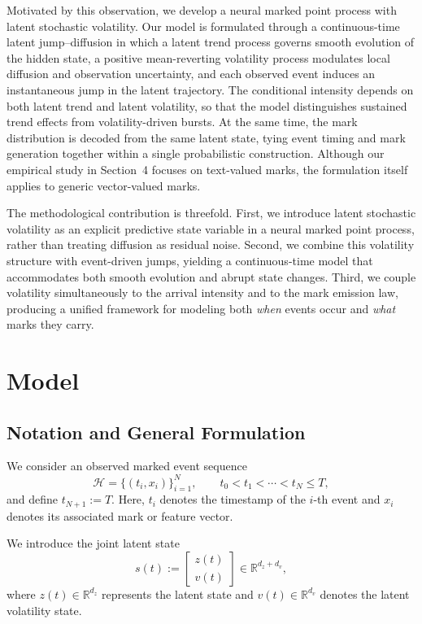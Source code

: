 \documentclass[11pt]{article}
\theoremstyle{definition}
\numberwithin{equation}{section}
\numberwithin{theorem}{section}
\numberwithin{proposition}{section}
\numberwithin{lemma}{section}
\numberwithin{corollary}{section}
\numberwithin{definition}{section}
\numberwithin{remark}{section}
\newcommand{\1}{\mathbbm{1}}
\begin{document}
Motivated by this observation, we develop a neural marked point process with latent stochastic volatility. 
Our model is formulated through a continuous-time latent jump--diffusion in which a latent trend process governs smooth evolution of the hidden state, a positive mean-reverting volatility process modulates local diffusion and observation uncertainty, and each observed event induces an instantaneous jump in the latent trajectory. 
The conditional intensity depends on both latent trend and latent volatility, so that the model distinguishes sustained trend effects from volatility-driven bursts. 
At the same time, the mark distribution is decoded from the same latent state, tying event timing and mark generation together within a single probabilistic construction. 
Although our empirical study in Section~4 focuses on text-valued marks, the formulation itself applies to generic vector-valued marks.

The methodological contribution is threefold. 
First, we introduce latent stochastic volatility as an explicit predictive state variable in a neural marked point process, rather than treating diffusion as residual noise. 
Second, we combine this volatility structure with event-driven jumps, yielding a continuous-time model that accommodates both smooth evolution and abrupt state changes. 
Third, we couple volatility simultaneously to the arrival intensity and to the mark emission law, producing a unified framework for modeling both \emph{when} events occur and \emph{what} marks they carry.

\section{Model}
\subsection{Notation and General Formulation}
\label{subsec:notation}

We consider an observed marked event sequence
\begin{equation}
\mathcal{H}=\{(t_i,x_i)\}_{i=1}^N,
\qquad
t_0 < t_1 < \cdots < t_N \le T,
\end{equation}
and define $t_{N+1}:=T$. Here, $t_i$ denotes the timestamp of the $i$-th event and $x_i$ denotes its associated mark or feature vector.

We introduce the joint latent state
\begin{equation}
s(t):=
\begin{bmatrix}
z(t)\\
v(t)
\end{bmatrix}
\in \mathbb{R}^{d_z+d_v},
\end{equation}
where $z(t)\in\mathbb{R}^{d_z}$ represents the latent state and $v(t)\in\mathbb{R}^{d_v}$ denotes the latent volatility state.
\end{document}

